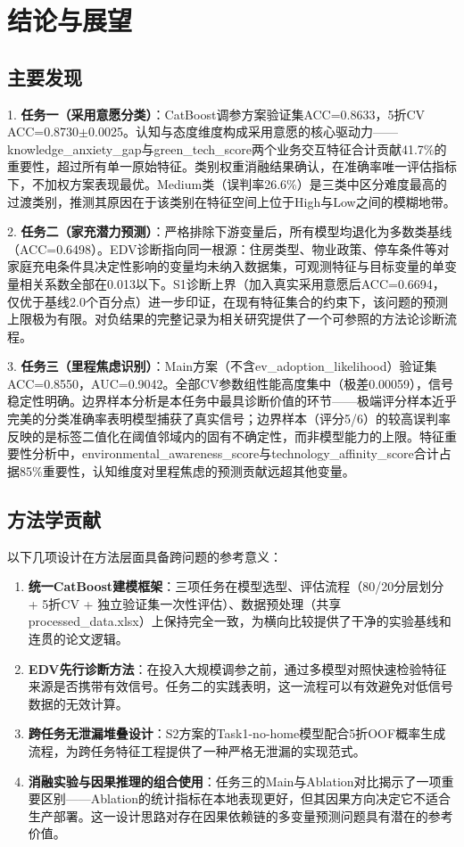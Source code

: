 \section{结论与展望}

\subsection{主要发现}

1. \textbf{任务一（采用意愿分类）}：CatBoost调参方案验证集ACC=0.8633，5折CV ACC=0.8730$\pm$0.0025。认知与态度维度构成采用意愿的核心驱动力——knowledge\_anxiety\_gap与green\_tech\_score两个业务交互特征合计贡献41.7\%的重要性，超过所有单一原始特征。类别权重消融结果确认，在准确率唯一评估指标下，不加权方案表现最优。Medium类（误判率26.6\%）是三类中区分难度最高的过渡类别，推测其原因在于该类别在特征空间上位于High与Low之间的模糊地带。

2. \textbf{任务二（家充潜力预测）}：严格排除下游变量后，所有模型均退化为多数类基线（ACC=0.6498）。EDV诊断指向同一根源：住房类型、物业政策、停车条件等对家庭充电条件具决定性影响的变量均未纳入数据集，可观测特征与目标变量的单变量相关系数全部在0.013以下。S1诊断上界（加入真实采用意愿后ACC=0.6694，仅优于基线2.0个百分点）进一步印证，在现有特征集合的约束下，该问题的预测上限极为有限。对负结果的完整记录为相关研究提供了一个可参照的方法论诊断流程。

3. \textbf{任务三（里程焦虑识别）}：Main方案（不含ev\_adoption\_likelihood）验证集ACC=0.8550，AUC=0.9042。全部CV参数组性能高度集中（极差0.00059），信号稳定性明确。边界样本分析是本任务中最具诊断价值的环节——极端评分样本近乎完美的分类准确率表明模型捕获了真实信号；边界样本（评分5/6）的较高误判率反映的是标签二值化在阈值邻域内的固有不确定性，而非模型能力的上限。特征重要性分析中，environmental\_awareness\_score与technology\_affinity\_score合计占据85\%重要性，认知维度对里程焦虑的预测贡献远超其他变量。

\subsection{方法学贡献}

以下几项设计在方法层面具备跨问题的参考意义：

\begin{enumerate}[itemsep=0pt]
\item \textbf{统一CatBoost建模框架}：三项任务在模型选型、评估流程（80/20分层划分 + 5折CV + 独立验证集一次性评估）、数据预处理（共享processed\_data.xlsx）上保持完全一致，为横向比较提供了干净的实验基线和连贯的论文逻辑。
\item \textbf{EDV先行诊断方法}：在投入大规模调参之前，通过多模型对照快速检验特征来源是否携带有效信号。任务二的实践表明，这一流程可以有效避免对低信号数据的无效计算。
\item \textbf{跨任务无泄漏堆叠设计}：S2方案的Task1-no-home模型配合5折OOF概率生成流程，为跨任务特征工程提供了一种严格无泄漏的实现范式。
\item \textbf{消融实验与因果推理的组合使用}：任务三的Main与Ablation对比揭示了一项重要区别——Ablation的统计指标在本地表现更好，但其因果方向决定它不适合生产部署。这一设计思路对存在因果依赖链的多变量预测问题具有潜在的参考价值。
\end{enumerate}

